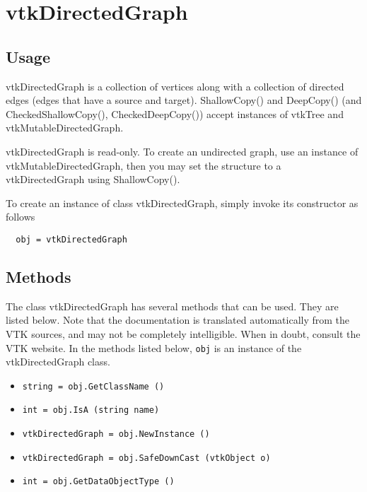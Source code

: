 \section{vtkDirectedGraph}

\subsection{Usage}

 vtkDirectedGraph is a collection of vertices along with a collection of
 directed edges (edges that have a source and target). ShallowCopy()
 and DeepCopy() (and CheckedShallowCopy(), CheckedDeepCopy())
 accept instances of vtkTree and vtkMutableDirectedGraph.

 vtkDirectedGraph is read-only. To create an undirected graph,
 use an instance of vtkMutableDirectedGraph, then you may set the
 structure to a vtkDirectedGraph using ShallowCopy().


To create an instance of class vtkDirectedGraph, simply
invoke its constructor as follows
\begin{verbatim}
  obj = vtkDirectedGraph
\end{verbatim}
\subsection{Methods}

The class vtkDirectedGraph has several methods that can be used.
  They are listed below.
Note that the documentation is translated automatically from the VTK sources,
and may not be completely intelligible.  When in doubt, consult the VTK website.
In the methods listed below, \verb|obj| is an instance of the vtkDirectedGraph class.
\begin{itemize}
\item  \verb|string = obj.GetClassName ()|

\item  \verb|int = obj.IsA (string name)|

\item  \verb|vtkDirectedGraph = obj.NewInstance ()|

\item  \verb|vtkDirectedGraph = obj.SafeDownCast (vtkObject o)|

\item  \verb|int = obj.GetDataObjectType ()|

\end{itemize}
